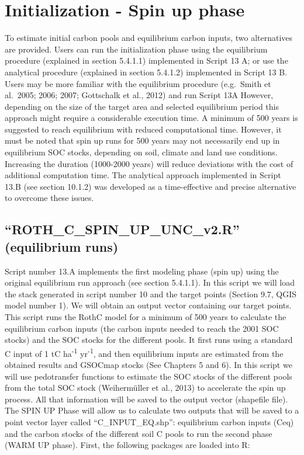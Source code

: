\documentclass[
  10pt,
  b5paper,
]{book}
\begin{document}
\hypertarget{initialization---spin-up-phase}{%
\section{Initialization - Spin up phase}\label{initialization---spin-up-phase}}

To estimate initial carbon pools and equilibrium carbon inputs, two alternatives are provided. Users can run the initialization phase using the equilibrium procedure (explained in section 5.4.1.1) implemented in Script 13 A; or use the analytical procedure (explained in section 5.4.1.2) implemented in Script 13 B. Users may be more familiar with the equilibrium procedure (e.g.~Smith et al.~2005; 2006; 2007; Gottschalk et al., 2012) and run Script 13A However, depending on the size of the target area and selected equilibrium period this approach might require a considerable execution time. A minimum of 500 years is suggested to reach equilibrium with reduced computational time. However, it must be noted that spin up runs for 500 years may not necessarily end up in equilibrium SOC stocks, depending on soil, climate and land use conditions. Increasing the duration (1000-2000 years) will reduce deviations with the cost of additional computation time. The analytical approach implemented in Script 13.B (see section 10.1.2) was developed as a time-effective and precise alternative to overcome these issues.

\hypertarget{roth_c_spin_up_unc_v2.r-equilibrium-runs}{%
\subsection{``ROTH\_C\_SPIN\_UP\_UNC\_v2.R'' (equilibrium runs)}\label{roth_c_spin_up_unc_v2.r-equilibrium-runs}}

Script number 13.A implements the first modeling phase (spin up) using the original equilibrium run approach (see section 5.4.1.1). In this script we will load the stack generated in script number 10 and the target points (Section 9.7, QGIS model number 1). We will obtain an output vector containing our target points. This script runs the RothC model for a minimum of 500 years to calculate the equilibrium carbon inputs (the carbon inputs needed to reach the 2001 SOC stocks) and the SOC stocks for the different pools. It first runs using a standard C input of 1 tC ha\textsuperscript{-1} yr\textsuperscript{-1}, and then equilibrium inputs are estimated from the obtained results and GSOCmap stocks (See Chapters 5 and 6). In this script we will use pedotransfer functions to estimate the SOC stocks of the different pools from the total SOC stock (Weihermüller et al., 2013) to accelerate the spin up process. All that information will be saved to the output vector (shapefile file).
The SPIN UP Phase will allow us to calculate two outputs that will be saved to a point vector layer called ``C\_INPUT\_EQ.shp'': equilibrium carbon inputs (Ceq) and the carbon stocks of the different soil C pools to run the second phase (WARM UP phase). First, the following packages are loaded into R:
\end{document}
